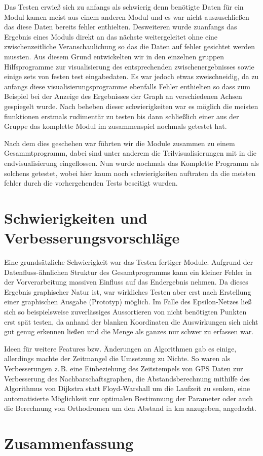 \documentclass[parskip=half,
 fontsize=12pt, bibtotoc,
 ngerman]
 {article}
\begin{document}
Das Testen erwieß sich zu anfangs als schwierig denn benötigte Daten für ein Modul kamen meist aus einem anderen Modul und es war nicht auszuschließen das diese Daten bereits fehler enthielten. Desweiteren wurde zuanfangs das Ergebnis eines Moduls direkt an das nächste weitergeleitet ohne eine zwischenzeitliche Veranschaulichung so das die Daten auf fehler gesichtet werden mussten. Aus diesem Grund entwickelten wir in den einzelnen gruppen Hilfsprogramme zur visualisierung des entsprechenden zwischenergebnisses sowie einige sets von festen test eingabedaten. Es war jedoch etwas zweischneidig, da zu anfangs diese visualisierungsprogramme ebenfalls Fehler enthielten so dass zum Beispiel bei der Anzeige des Ergebnisses der Graph an verschiedenen Achsen gespiegelt wurde. Nach beheben dieser schwierigkeiten war es möglich die meisten fiunktionen erstmals rudimentär zu testen bis dann schließlich einer aus der Gruppe das komplette Modul im zusammenspiel nochmals getestet hat.

Nach dem dies geschehen war führten wir die Module zusammen zu einem Gesammtprogramm, dabei sind unter anderem die Teilvisualisierungen mit in die endvisualisierung eingeflossen. Nun wurde nochmals das Komplette Programm als solchens getestet, wobei hier kaum noch schwierigkeiten auftraten da die meisten fehler durch die vorhergehenden Tests beseitigt wurden.

\section{Schwierigkeiten und Verbesserungsvorschläge}

Eine grundsätzliche Schwierigkeit war das Testen fertiger Module.
Aufgrund der Datenfluss-ähnlichen Struktur des Gesamtprogramms kann
ein kleiner Fehler in der Vorverarbeitung massiven Einfluss
auf das Endergebnis nehmen. Da dieses Ergebnis graphischer Natur ist,
war wirkliches Testen aber erst nach Erstellung einer graphischen Ausgabe
(Prototyp) möglich. Im Falle des Epsilon-Netzes ließ sich so beispielsweise 
zuverlässiges Aussortieren von nicht benötigten Punkten erst spät testen,
da anhand der blanken Koordinaten die Auswirkungen sich nicht gut genug
erkennen ließen und die Menge als ganzes nur schwer zu erfassen war.

Ideen für weitere Features bzw. Änderungen an Algorithmen gab es einige, 
allerdings machte der Zeitmangel die Umsetzung zu Nichte. So waren
als Verbesserungen z.\,B. eine Einbeziehung des Zeitstempels von GPS Daten
zur Verbesserung des Nachbarschaftsgraphen, die Abstandsberechnung mithilfe des
Algorithmus von Dijkstra statt Floyd-Warshall um die Laufzeit zu senken,
eine automatisierte Möglichkeit zur optimalen Bestimmung der Parameter oder
auch die Berechnung von Orthodromen um den Abstand in km anzugeben, angedacht.

\section{Zusammenfassung}
\printbibliography
\end{document}
